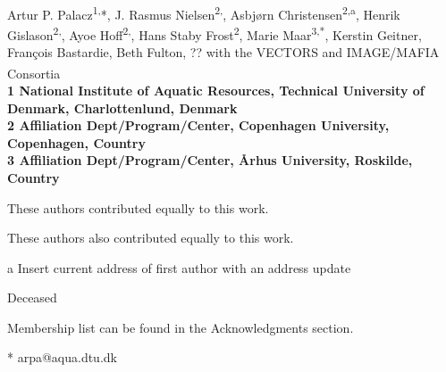 \documentclass[10pt,letterpaper]{article}
\date{}
\begin{document}
\vspace*{0.35in}

\begin{flushleft}
{\Large
\textbf{}
}
\newline
\\
Artur P. Palacz\textsuperscript{1,\Yinyang}*,
J. Rasmus Nielsen\textsuperscript{2,\Yinyang},
Asbjørn Christensen\textsuperscript{2,\textcurrency a},
Henrik Gislason\textsuperscript{2,\ddag},
Ayoe Hoff\textsuperscript{2,\ddag},
Hans Staby Frost\textsuperscript{2},
Marie Maar\textsuperscript{3,*},
Kerstin Geitner,
François Bastardie,
Beth Fulton,
?? with the VECTORS and IMAGE/MAFIA Consortia\textsuperscript{\textpilcrow}
\\
\bigskip
\bf{1} National Institute of Aquatic Resources, Technical University of Denmark, Charlottenlund, Denmark
\\
\bf{2} Affiliation Dept/Program/Center, Copenhagen University, Copenhagen, Country
\\
\bf{3} Affiliation Dept/Program/Center, Århus University, Roskilde, Country
\\
\bigskip

% 
%
\Yinyang These authors contributed equally to this work.

\ddag These authors also contributed equally to this work.

\textcurrency a Insert current address of first author with an address update

\dag Deceased

\textpilcrow Membership list can be found in the Acknowledgments section.

* arpa@aqua.dtu.dk

\end{flushleft}
\end{document}
